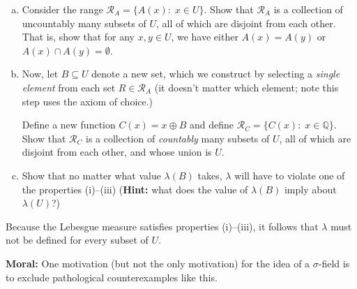 \documentclass{article}
\newcommand{\cR}{\mathcal{R}}
\newcommand{\QQ}{\mathbb{Q}}
\begin{document}
\begin{description}
\begin{enumerate}[(a)]
\item Consider the range $\cR_A = \{A(x):\; x\in U\}$. Show that $\cR_A$ is a collection of uncountably many subsets of $U$, all of which are disjoint from each other. That is, show that for any $x,y\in U$, we have either $A(x)=A(y)$ or $A(x) \cap A(y) = \emptyset$.


\item Now, let $B\subseteq U$ denote a new set, which we construct by selecting a {\em single element} from each set $R\in\cR_A$ (it doesn't matter which element; note this step uses the axiom of choice.)

Define a new function $C(x) = x \oplus B$ and define $\cR_C = \{C(x):\; x \in \QQ\}$. Show that $\cR_C$ is a collection of {\em countably} many subsets of $U$, all of which are disjoint from each other, and whose union is $U$.

\item Show that no matter what value $\lambda(B)$ takes, $\lambda$ will have to violate one of the properties (i)--(iii) ({\bf Hint:} what does the value of $\lambda(B)$ imply about $\lambda(U)$?)
\end{enumerate}

Because the Lebesgue measure satisfies properties (i)--(iii), it follows that $\lambda$ must not be defined for every subset of $U$.

{\bf Moral:} One motivation (but not the only motivation) for the idea of a $\sigma$-field is to exclude pathological counterexamples like this.


\end{description}
\end{document}
